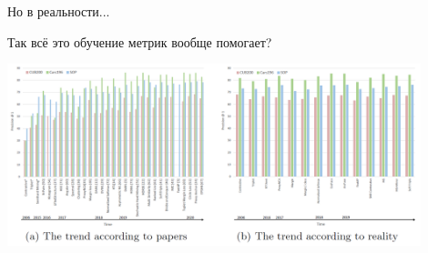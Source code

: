 \begin{frame}{Но в реальности...}

Так всё это обучение метрик вообще помогает?

\begin{center}
    \includegraphics[width=0.9\textwidth]{images/reality check.png}
\end{center}

\end{frame}
